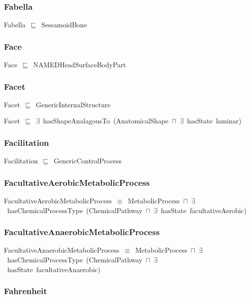 \documentclass{article}
\begin{document}
\subsubsection*{Fabella}

Fabella~\ensuremath{\sqsubseteq}~SessamoidBone~

\subsubsection*{Face}

Face~\ensuremath{\sqsubseteq}~NAMEDHeadSurfaceBodyPart~

\subsubsection*{Facet}

Facet~\ensuremath{\sqsubseteq}~GenericInternalStructure~

Facet~\ensuremath{\sqsubseteq}~\ensuremath{\exists}~hasShapeAnalagousTo~(AnatomicalShape~\ensuremath{\sqcap}~\ensuremath{\exists}~hasState~laminar)~

\subsubsection*{Facilitation}

Facilitation~\ensuremath{\sqsubseteq}~GenericControlProcess~

\subsubsection*{FacultativeAerobicMetabolicProcess}

FacultativeAerobicMetabolicProcess~\ensuremath{\equiv}~MetabolicProcess~\ensuremath{\sqcap}~\ensuremath{\exists}~hasChemicalProcessType~(ChemicalPathway~\ensuremath{\sqcap}~\ensuremath{\exists}~hasState~facultativeAerobic)

\subsubsection*{FacultativeAnaerobicMetabolicProcess}

FacultativeAnaerobicMetabolicProcess~\ensuremath{\equiv}~MetabolicProcess~\ensuremath{\sqcap}~\ensuremath{\exists}~hasChemicalProcessType~(ChemicalPathway~\ensuremath{\sqcap}~\ensuremath{\exists}~hasState~facultativeAnaerobic)

\subsubsection*{Fahrenheit}
\end{document}

